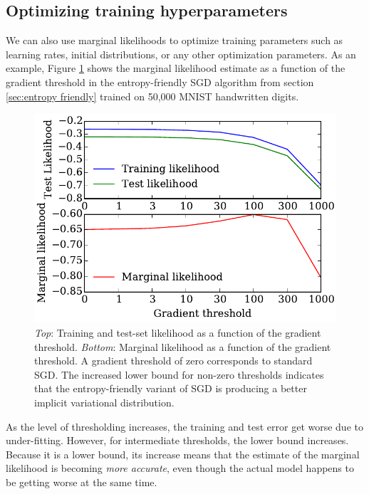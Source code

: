 \documentclass[]{article}
\begin{document}
\subsection{Optimizing training hyperparameters}

We can also use marginal likelihoods to optimize training parameters such as learning rates, initial distributions, or any other optimization parameters.
As an example, Figure \ref{fig:threshold} shows the marginal likelihood estimate as a function of the gradient threshold in the entropy-friendly SGD algorithm from section \ref{sec:entropy friendly} trained on 50,000 MNIST handwritten digits.

\begin{figure}[h!]
\begin{center}
\includegraphics[width=\columnwidth]{../experiments/2015_03_03_vary_width/5_grad_threshold/vary_widths.pdf}
\vskip -0.1in
\caption{\emph{Top}: Training and test-set likelihood as a function of the gradient threshold.
\emph{Bottom}: Marginal likelihood as a function of the gradient threshold.
A gradient threshold of zero corresponds to standard SGD.
The increased lower bound for non-zero thresholds indicates that the entropy-friendly variant of SGD is producing a better implicit variational distribution.}
\label{fig:threshold}
\end{center}
\end{figure}

As the level of thresholding increases, the training and test error get worse due to under-fitting.
However, for intermediate thresholds, the lower bound increases.
Because it is a lower bound, its increase means that the estimate of the marginal likelihood is becoming \emph{more accurate}, even though the actual model happens to be getting worse at the same time.
\end{document}
